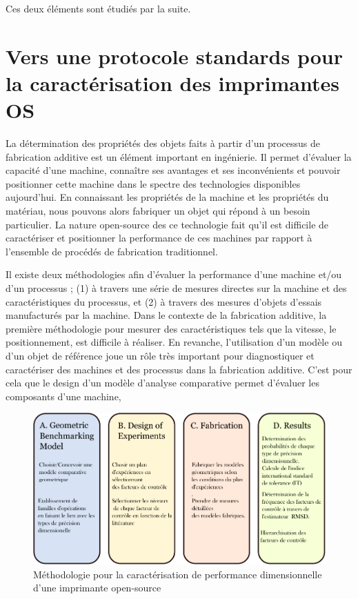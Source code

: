 Ces deux éléments sont étudiés  par la suite.




\section*{Vers une protocole standards pour la caractérisation des imprimantes OS}

La détermination des propriétés des objets faits à partir d’un processus de fabrication additive est un élément important en ingénierie. Il permet d’évaluer la capacité d’une machine, connaître ses avantages et ses inconvénients et pouvoir
positionner cette machine dans le spectre des technologies disponibles aujourd’hui.
En connaissant les propriétés de la machine et les propriétés du matériau, nous pouvons alors fabriquer un objet qui répond à un besoin particulier.
La nature open-source des ce technologie fait qu'il est difficile de caractériser et positionner la performance de ces machines par rapport à l'ensemble de procédés de fabrication traditionnel.

Il existe deux méthodologies afin d’évaluer la performance d’une machine et/ou d’un processus ; 
(1) à travers une série de mesures directes sur la machine et des caractéristiques du processus, 
et (2) à travers des mesures d'objets d'essais manufacturés par la machine. 
Dans le contexte de la fabrication additive, la première méthodologie pour mesurer des caractéristiques tels que la vitesse, le positionnement, est difficile à réaliser.
En revanche, l’utilisation d’un modèle ou d’un objet de référence joue un rôle très important pour diagnostiquer et caractériser des machines et des processus dans la fabrication additive. 
C’est pour cela que le design d’un modèle d’analyse comparative permet d’évaluer les composants d’une machine,

\begin{figure} [!b]
	\centering
	\includegraphics[scale=0.8]{Figures/Francais/Methodology-Master.pdf}
	\caption[]{Méthodologie pour la caractérisation de performance dimensionnelle d'une imprimante open-source}
	\label{Methodology.Master}
\end{figure}  


